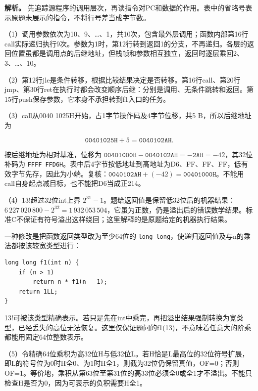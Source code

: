 
\textbf{解析。} 先追踪源程序的调用层次，再读指令对PC和数据的作用。表中的省略号表示原题未展示的指令，不将行号差当成字节数。

（1）调用参数依次为10、9、\ldots、1，共10次，包含最外层调用；函数内部第16行call实际递归执行9次。参数为1时，第12行转到返回1的分支，不再递归。各层的返回位置虽都是调用点的后继地址，但栈帧和参数相互独立，返回时逐层乘回2、3、\ldots、10。

（2）第12行jle是条件转移，根据比较结果决定是否转移。第16行call、第20行jmp、第30行ret在执行时都会改变顺序后继：分别是调用、无条件跳转和返回。第15行push保存参数，它本身不承担转到f1入口的任务。

（3）call从0040 1025H开始，占1字节操作码及4字节位移，共5 B，所以后继地址为

\[
\mathtt{00401025H}+5=\mathtt{0040102AH}.
\]

按后继地址为相对基准，位移为 \(\mathtt{00401000H}-\mathtt{0040102AH}=-\mathtt{2AH}=-42\)，其32位补码为 \texttt{FFFF\ FFD6H}。表中后4字节按低地址到高地址为D6、FF、FF、FF，低有效字节先存，因此为小端。复核：\(\mathtt{0040102AH}+(-42)=\mathtt{00401000H}\)。不能用call自身起点减目标，也不能把D6当成正214。

（4）13!超过32位int上界 \(2^{31}-1\)。题给返回值是保留低32位后的机器结果：\(6\,227\,020\,800-2^{32}=1\,932\,053\,504\)，它虽为正数，仍是溢出后的错误数学结果。标准C不保证有符号溢出这样绕回；这里解释的是原题给定的机器执行结果。

一种修改是把函数返回类型改为至少64位的 \texttt{long\ long}，使递归返回值及与n的乘法都按该较宽类型进行：

\par\medskip\noindent
\begin{minipage}{\linewidth}
\begin{verbatim}
long long f1(int n) {
    if (n > 1)
        return n * f1(n - 1);
    return 1LL;
}
\end{verbatim}
\end{minipage}\par\medskip

13!可被该类型精确表示。若只是先在int中乘完，再把溢出结果强制转换为宽类型，已经丢失的高位无法恢复。这里仅保证题问的f1(13)，不意味着任意大的阶乘都能用固定64位整数表示。

（5）令精确64位乘积为高32位H与低32位L。若H恰是L最高位的32位符号扩展，即L的符号位为0时H全0、为1时H全1，则截为32位仍保留真值，OF=0；否则OF=1。等价地，乘积从第63位至第31位的高33位必须全0或全1才不溢出。不能只检查H是否为0，因为可表示的负积需要H全1。

